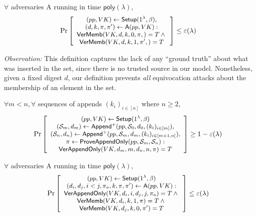 \label{s:aas:membership-security}
$\forall$ adversaries \textsf{A} running in time $\mathsf{poly}(\lambda)$,
\begin{align*}
\small
\Pr \left[ \begin{array}{c}
(pp,VK) \leftarrow \mathsf{Setup}(1^\lambda, \beta), \\
(d, k,\pi,\pi') \leftarrow \mathsf{A}(pp, VK)
: \\
{\mathsf{VerMemb}(VK,d, k,0,\pi ,) = T} \wedge {} \\
{\mathsf{VerMemb}(VK,d, k,1,\pi',) = T}
\end{array} \right] \le \varepsilon(\lambda)
\end{align*}

\noindent \textit{Observation:}
This definition captures the lack of any ``ground truth'' about what was inserted in the set, since there is no trusted source in our model.
Nonetheless, given a fixed digest $d$, our definition prevents \textit{all} equivocation attacks about the membership of an element in the set.

\label{s:aas:appendonly-correctness}
$\forall m < n,\forall$ sequences of appends $(k_i)_{i\in[n]}$ where $n\ge2$,
\begin{align*}
\small
\Pr \left[ \begin{array}{c}
(pp,VK) \leftarrow \mathsf{Setup}(1^\lambda, \beta) \\
(\mathcal{S}_m, d_m) \leftarrow \mathsf{Append}^{+}(pp,\mathcal{S}_0,d_0,(k_i)_{i\in[m]}),\\
(\mathcal{S}_n, d_n) \leftarrow \mathsf{Append}^{+}(pp,\mathcal{S}_m,d_m,(k_i)_{i\in[m+1,n]}),  \\
\pi \leftarrow \mathsf{ProveAppendOnly}(pp,\mathcal{S}_m, \mathcal{S}_n):\\
{\mathsf{VerAppendOnly}(VK, d_m, m, d_n, n, \pi) = T}
\end{array} \right] \ge 1 - \varepsilon(\lambda)
\end{align*}

\label{s:aas:appendonly-security}
$\forall$ adversaries \textsf{A} running in time $\mathsf{poly}(\lambda)$,
\begin{align*}
\small
\Pr \left[ \begin{array}{c}
(pp,VK) \leftarrow \mathsf{Setup}(1^\lambda, \beta)\\
(d_i,d_j,i < j,\pi_a, k,\pi,\pi') \leftarrow \mathsf{A}(pp, VK)
: \\
{\mathsf{VerAppendOnly}(VK, d_i, i, d_j, j, \pi_a) = T} \wedge {}\\
{\mathsf{VerMemb}(VK, d_i, k, 1, \pi )  = T} \wedge {}\\
{\mathsf{VerMemb}(VK, d_j, k, 0, \pi') = T}
\end{array} \right] \le \varepsilon(\lambda)
\end{align*}

